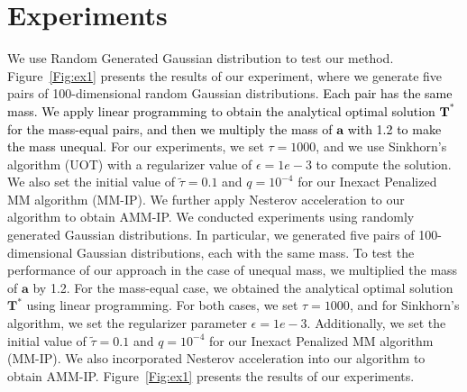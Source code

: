 \documentclass[a4paper,twocolumn]{article}
\newcommand{\mat}[1]{\mathbf{#1}}
\renewcommand{\vec}[1]{\bm{#1}}
\newcommand{\changeSX}[1]{\textcolor{black}{#1}}
\begin{document}
\section{Experiments}
We use Random Generated Gaussian distribution to test our method. Figure~\ref{Fig:ex1} presents the results of our experiment, where we generate five pairs of 100-dimensional random Gaussian distributions. \changeSX{ Each pair has the same mass. We apply linear programming to obtain the analytical optimal solution $\mat T^{*}$ for the mass-equal pairs, and then we multiply the mass of $\vec a$ with 1.2 to make the mass unequal. }For our experiments, we set $\tau = 1000$, and we use Sinkhorn's algorithm (UOT) with a regularizer value of $\epsilon = 1e-3$ to compute the solution. We also set the initial value of $\tilde{\tau} = 0.1$ and $q = 10^{-4}$ for our Inexact Penalized MM algorithm (MM-IP). We further apply Nesterov acceleration to our algorithm to obtain AMM-IP.
We conducted experiments using randomly generated Gaussian distributions. In particular, we generated five pairs of 100-dimensional Gaussian distributions, each with the same mass. To test the performance of our approach in the case of unequal mass, we multiplied the mass of $\vec a$ by 1.2. For the mass-equal case, we obtained the analytical optimal solution $\mat T^{*}$ using linear programming. For both cases, we set $\tau = 1000$, and for Sinkhorn's algorithm, we set the regularizer parameter $\epsilon = 1e-3$. Additionally, we set the initial value of $\tilde{\tau} = 0.1$ and $q = 10^{-4}$ for our Inexact Penalized MM algorithm (MM-IP). We also incorporated Nesterov acceleration into our algorithm to obtain AMM-IP. Figure~\ref{Fig:ex1} presents the results of our experiments.
\end{document}
